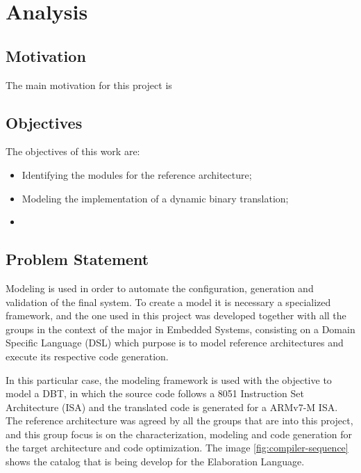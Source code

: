 \documentclass[11pt]{report}
\begin{document}
\chapter{Analysis}

	\section{Motivation}
	
	\par The main motivation for this project is 

	\section{Objectives}
	
	\par The objectives of this work are:
	\begin{itemize}
		\item Identifying the modules for the reference architecture;
		\item Modeling the implementation of a dynamic binary translation;
		\item 
	\end{itemize}

	\section{Problem Statement}
	
	\par Modeling is used in order to automate the configuration, generation and validation of the final system. To create a model it is necessary a specialized framework, and the one used in this project was developed together with all the groups in the context of the major in Embedded Systems, consisting on a Domain Specific Language (DSL) which purpose is to model reference architectures and execute its respective code generation. 
	\par In this particular case, the modeling framework is used with the objective to model a DBT, in which the source code follows a 8051 Instruction Set Architecture (ISA) and the translated code is generated for a ARMv7-M ISA.  The reference architecture was agreed by all the groups that are into this project, and this group focus is on the characterization, modeling and code generation for the target architecture and code optimization. The image \ref{fig:compiler-sequence} shows the catalog that is being develop for the Elaboration Language.
	
\end{document}
